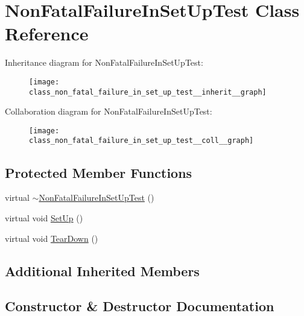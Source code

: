 \hypertarget{class_non_fatal_failure_in_set_up_test}{}\section{Non\+Fatal\+Failure\+In\+Set\+Up\+Test Class Reference}
\label{class_non_fatal_failure_in_set_up_test}


Inheritance diagram for Non\+Fatal\+Failure\+In\+Set\+Up\+Test\+:
\nopagebreak
\begin{figure}[H]
\begin{center}
\leavevmode
\texttt{[image: class\_non\_fatal\_failure\_in\_set\_up\_test\_\_inherit\_\_graph]}
\end{center}
\end{figure}


Collaboration diagram for Non\+Fatal\+Failure\+In\+Set\+Up\+Test\+:
\nopagebreak
\begin{figure}[H]
\begin{center}
\leavevmode
\texttt{[image: class\_non\_fatal\_failure\_in\_set\_up\_test\_\_coll\_\_graph]}
\end{center}
\end{figure}
\subsection*{Protected Member Functions}
\begin{DoxyCompactItemize}
\item 
virtual \hyperlink{class_non_fatal_failure_in_set_up_test_ae4b4ee1812e3427cf82b155256547442}{$\sim$\+Non\+Fatal\+Failure\+In\+Set\+Up\+Test} ()
\item 
virtual void \hyperlink{class_non_fatal_failure_in_set_up_test_ae24c724bae1fcd2601f58fa9c26adca3}{Set\+Up} ()
\item 
virtual void \hyperlink{class_non_fatal_failure_in_set_up_test_a36abc808b11afc6a9bfa20dac5c28c30}{Tear\+Down} ()
\end{DoxyCompactItemize}
\subsection*{Additional Inherited Members}


\subsection{Constructor \& Destructor Documentation}
